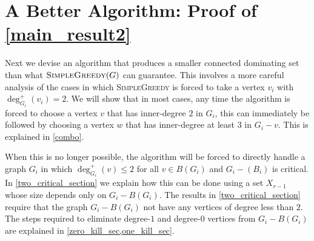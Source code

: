 \documentclass[11pt]{article}
\theoremstyle{definition}
\begin{document}
%
%

\section{A Better Algorithm: Proof of \cref{main_result2}}
\label{full_result}

Next we devise an algorithm that produces a smaller connected dominating set than what $\textsc{SimpleGreedy}(G)$ can guarantee.  This involves a more careful analysis of the cases in which \textsc{SimpleGreedy} is forced to take a vertex $v_i$ with $\deg^+_{G_i}(v_i)=2$.  We will show that in most cases, any time the algorithm is forced to choose a vertex $v$ that has inner-degree $2$ in $G_i$, this can immediately be followed by choosing a vertex $w$ that has inner-degree at least $3$ in $G_i-v$.  This is explained in \cref{combo}.

When this is no longer possible, the algorithm will be forced to directly handle a graph $G_i$ in which $\deg^+_{G_i}(v)\le 2$ for all $v\in B(G_i)$ and $G_i-(B_i)$ is critical.  In \cref{two_critical_section} we explain how this can be done using a set $X_{r-1}$ whose size depends only on $G_i-B(G_i)$.  The results in \cref{two_critical_section} require that the graph $G_i-B(G_i)$ not have any vertices of degree less than $2$.  The steps required to eliminate degree-$1$ and degree-$0$ vertices from $G_i-B(G_i)$ are explained in \cref{zero_kill_sec,one_kill_sec}.
\end{document}
